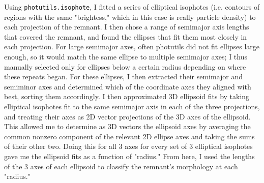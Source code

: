 \documentclass[twocolumn]{aastex631}
\begin{document}
Using \texttt{photutils.isophote}, I fitted a series of elliptical isophotes (i.e. contours of regions with the same "brightess," which in this case is really particle density) to each projection of the remnant.
I then chose a range of semimajor axis lengths that covered the remnant, and found the ellipses that fit them most closely in each projection.
For large semimajor axes, often photutils did not fit ellipses large enough, so it would match the same ellipse to multiple semimajor axes; I thus manually selected only for ellipses below a certain radius depending on where these repeats began.
For these ellipses, I then extracted their semimajor and semiminor axes and determined which of the coordinate axes they aligned with best, sorting them accordingly.
I then approximated 3D ellipsoid fits by taking elliptical isophotes fit to the same semimajor axis in each of the three projections, and treating their axes as 2D vector projections of the 3D axes of the ellipsoid.
This allowed me to determine as 3D vectors the ellipsoid axes by averaging the common nonzero component of the relevant 2D ellipse axes and taking the sums of their other two.
Doing this for all 3 axes for every set of 3 elliptical isophotes gave me the ellipsoid fits as a function of "radius."
From here, I used the lengths of the 3 axes of each ellipsoid to classify the remnant's morphology at each "radius."
\end{document}
